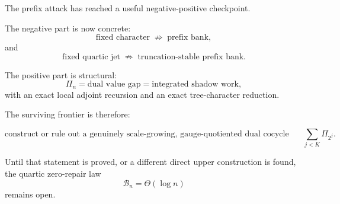\documentclass[11pt,a4paper]{article}
\newcommand{\Bcal}{\mathcal B}
\begin{document}
The prefix attack has reached a useful negative-positive checkpoint.

The negative part is now concrete:
\[
\boxed{
\text{fixed character}
\;\not\Rightarrow\;
\text{prefix bank},
}
\]
and
\[
\boxed{
\text{fixed quartic jet}
\;\not\Rightarrow\;
\text{truncation-stable prefix bank}.
}
\]

The positive part is structural:
\[
\boxed{
\Pi_n
=
\text{dual value gap}
=
\text{integrated shadow work},
}
\]
with an exact local adjoint recursion and an exact tree-character reduction.

The surviving frontier is therefore:

\[
\boxed{
\text{construct or rule out a genuinely scale-growing,
gauge-quotiented dual cocycle whose window energy controls }
\sum_{j<K}\Pi_{2^j}.
}
\]

Until that statement is proved, or a different direct upper construction is
found, the quartic zero-repair law
\[
\Bcal_n=\Theta(\log n)
\]
remains open.
\end{document}
